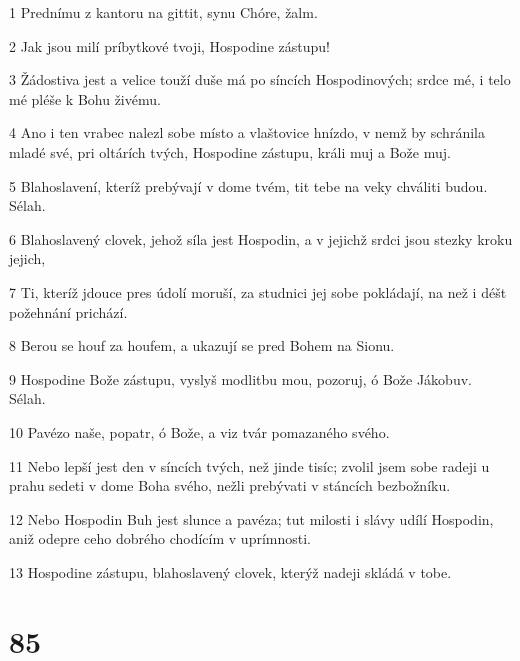 \par 1 Prednímu z kantoru na gittit, synu Chóre, žalm.
\par 2 Jak jsou milí príbytkové tvoji, Hospodine zástupu!
\par 3 Žádostiva jest a velice touží duše má po síncích Hospodinových; srdce mé, i telo mé pléše k Bohu živému.
\par 4 Ano i ten vrabec nalezl sobe místo a vlaštovice hnízdo, v nemž by schránila mladé své, pri oltárích tvých, Hospodine zástupu, králi muj a Bože muj.
\par 5 Blahoslavení, kteríž prebývají v dome tvém, tit tebe na veky chváliti budou. Sélah.
\par 6 Blahoslavený clovek, jehož síla jest Hospodin, a v jejichž srdci jsou stezky kroku jejich,
\par 7 Ti, kteríž jdouce pres údolí moruší, za studnici jej sobe pokládají, na než i déšt požehnání prichází.
\par 8 Berou se houf za houfem, a ukazují se pred Bohem na Sionu.
\par 9 Hospodine Bože zástupu, vyslyš modlitbu mou, pozoruj, ó Bože Jákobuv. Sélah.
\par 10 Pavézo naše, popatr, ó Bože, a viz tvár pomazaného svého.
\par 11 Nebo lepší jest den v síncích tvých, než jinde tisíc; zvolil jsem sobe radeji u prahu sedeti v dome Boha svého, nežli prebývati v stáncích bezbožníku.
\par 12 Nebo Hospodin Buh jest slunce a pavéza; tut milosti i slávy udílí Hospodin, aniž odepre ceho dobrého chodícím v uprímnosti.
\par 13 Hospodine zástupu, blahoslavený clovek, kterýž nadeji skládá v tobe.

\chapter{85}

